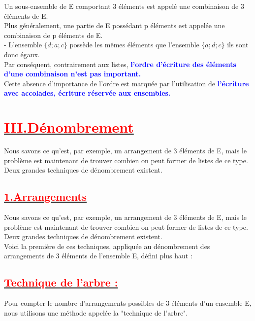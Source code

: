 \documentclass[12pt]{article}
\begin{document}
Un sous-ensemble de E comportant 3 éléments est appelé une combinaison de 3 éléments de E.\\

Plus généralement, une partie de E possédant p éléments est appelée une combinaison de p éléments de E.\\

- L’ensemble $\lbrace d ; a ; c \rbrace$ possède les mêmes éléments que l’ensemble $\lbrace a ; d ; c \rbrace$ ils sont donc égaux.\\
Par conséquent, contrairement aux listes, \textbf{\textcolor{blue}{l’ordre d’écriture des éléments d’une combinaison n'est pas important.}}\\

Cette absence d’importance de l’ordre est marquée par l’utilisation de 
\textbf{\textcolor{blue}{l’écriture avec accolades, écriture réservée aux ensembles.}}
\section*{\underline{\textbf{\textcolor{red}{III.Dénombrement}}}}
Nous savons ce qu’est, par exemple, un arrangement de 3 éléments de E, mais le problème est maintenant de trouver combien on peut former de listes de ce type.\\
Deux grandes techniques de dénombrement existent. 
\subsection*{\underline{\textbf{\textcolor{red}{1.Arrangements}}}}
Nous savons ce qu’est, par exemple, un arrangement de 3 éléments de E,
mais le problème est maintenant de trouver combien on peut former de listes de ce type.\\

Deux grandes techniques de dénombrement existent.\\

Voici la première de ces techniques, appliquée au dénombrement des arrangements de 3 éléments
de l’ensemble E, défini plus haut : \\
\subsection*{\underline{\textbf{\textcolor{red}{Technique de l’arbre :}}}}
Pour compter le nombre d'arrangements possibles de 3 éléments d'un ensemble E, nous utilisons une méthode appelée la "technique de l'arbre".\\
\end{document}
